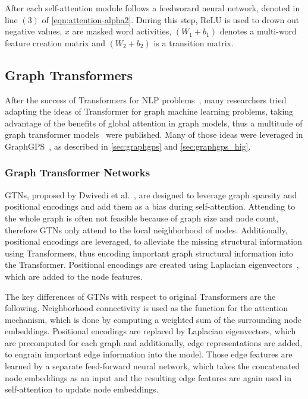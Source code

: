 After each self-attention module follows a feedworard neural network, denoted in line $(3)$ of \autoref{eqn:attention-alpha2}. During this step, ReLU is used to drown out negative values, $x$ are masked word activities, $(W_1 + b_1)$ denotes a multi-word feature creation matrix and $(W_2 + b_2)$ is a transition matrix.

\subsection{Graph Transformers}
After the success of Transformers for NLP problems~\cite{kalyan2021ammus}, many researchers tried adapting the ideas of Transformer for graph machine learning problems, taking advantage of the benefits of global attention in graph models, thus a multitude of graph transformer models~\cite{dwivedi2021generalizationTransformer,2021graphormer,kreuzer2021rethinking,mialon2021graphit,wu2022representing} were published. Many of those ideas were leveraged in GraphGPS~\cite{2023graphgps}, as described in \ref{sec:graphgps} and \ref{sec:graphgps_hig}.

\subsubsection{Graph Transformer Networks}
GTNs, proposed by Dwivedi et al.~\cite{dwivedi2021generalizationTransformer}, are designed to leverage graph sparsity and positional encodings and add them as a bias during self-attention. Attending to the whole graph is often not feasible because of graph size and node count, therefore GTNs only attend to the local neighborhood of nodes. Additionally, positional encodings are leveraged, to alleviate the missing structural information using Transformers, thus encoding important graph structural information into the Transformer. Positional encodings are created using Laplacian eigenvectors~\cite{belkin2003laplacian}, which are added to the node features.

The key differences of GTNs with respect to original Transformers are the following. Neighborhood connectivity is used as the function for the attention mechanism, which is done by computing a weighted sum of the surrounding node embeddings. Positional encodings are replaced by Laplacian eigenvectors, which are precomputed for each graph and additionally, edge representations are added, to engrain important edge information into the model. Those edge features are learned by a separate feed-forward neural network, which takes the concatenated node embeddings as an input and the resulting edge features are again used in self-attention to update node embeddings.


